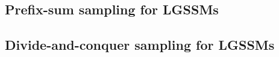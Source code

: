 

\subsection{Prefix-sum sampling for LGSSMs}
\label{subsec:prefix-sum-sampling}


\subsection{Divide-and-conquer sampling for LGSSMs}
\label{subsec:dnc-sampling}

